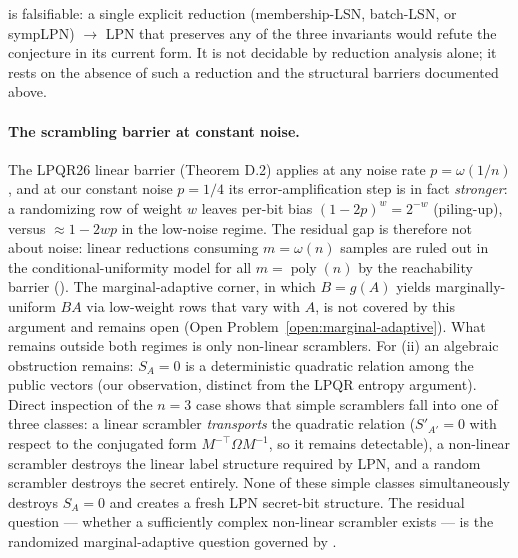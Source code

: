 \documentclass[11pt,a4paper]{article}
\theoremstyle{plain}
\theoremstyle{definition}
\begin{document}
 is falsifiable: a single explicit reduction (membership-LSN, batch-LSN, or sympLPN) $\to$ LPN that preserves any of the three invariants would refute the conjecture in its current form. It is not decidable by reduction analysis alone; it rests on the absence of such a reduction and the structural barriers documented above.

\paragraph{The scrambling barrier at constant noise.} The LPQR26 linear barrier (Theorem D.2) applies at any noise rate $p=\omega(1/n)$, and at our constant noise $p=1/4$ its error-amplification step is in fact \emph{stronger}: a randomizing row of weight $w$ leaves per-bit bias $(1-2p)^w = 2^{-w}$ (piling-up), versus $\approx 1-2wp$ in the low-noise regime. The residual gap is therefore not about noise: linear reductions consuming $m=\omega(n)$ samples are ruled out in the conditional-uniformity model for all $m=\operatorname{poly}(n)$ by the reachability barrier ().  The marginal-adaptive corner, in which $B=g(A)$ yields marginally-uniform $BA$ via low-weight rows that vary with $A$, is not covered by this argument and remains open (Open Problem~\ref{open:marginal-adaptive}).  What remains outside both regimes is only non-linear scramblers. For (ii) an algebraic obstruction remains: $S_A=0$ is a deterministic quadratic relation among the public vectors (our observation, distinct from the LPQR entropy argument). Direct inspection of the $n=3$ case shows that simple scramblers fall into one of three classes: a linear scrambler \emph{transports} the quadratic relation ($S'_{A'}=0$ with respect to the conjugated form $M^{-\top}\Omega M^{-1}$, so it remains detectable), a non-linear scrambler destroys the linear label structure required by LPN, and a random scrambler destroys the secret entirely. None of these simple classes simultaneously destroys $S_A=0$ and creates a fresh LPN secret-bit structure. The residual question --- whether a sufficiently complex non-linear scrambler exists --- is the randomized marginal-adaptive question governed by .
\end{document}
